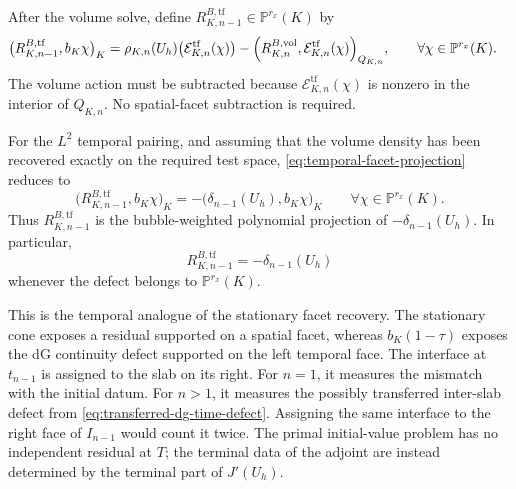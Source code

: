 After the volume solve, define \(R_{K,n-1}^{B,\mathrm{tf}}\in\mathbb P^{r_x}(K)\) by
\begin{equation}
  \begin{aligned}
  \bigl(
    R_{K,n-1}^{B,\mathrm{tf}},
    b_K\chi
  \bigr)_K
  ={}&
  \rho_{K,n}(U_h)
  \bigl(\mathcal{E}_{K,n}^{\mathrm{tf}}(\chi)\bigr) -
  \Bigl(
    R_{K,n}^{B,\mathrm{vol}},
    \mathcal{E}_{K,n}^{\mathrm{tf}}(\chi)
  \Bigr)_{Q_{K,n}},
  \qquad
  \forall\chi\in\mathbb P^{r_x}(K).
  \end{aligned}
  \label{eq:temporal-facet-projection}
\end{equation}
The volume action must be subtracted because \(\mathcal{E}_{K,n}^{\mathrm{tf}}(\chi)\) is nonzero in the interior of \(Q_{K,n}\). No spatial-facet subtraction is required.

For the \(L^2\) temporal pairing, and assuming that the volume density has been recovered exactly on the required test space, \cref{eq:temporal-facet-projection} reduces to
\begin{equation}
  \bigl(
    R_{K,n-1}^{B,\mathrm{tf}},
    b_K\chi
  \bigr)_K
  =
  -
  \bigl(
    \delta_{n-1}(U_h),
    b_K\chi
  \bigr)_K
  \qquad
  \forall\chi\in\mathbb P^{r_x}(K).
  \label{eq:temporal-density-projected-jump}
\end{equation}
Thus \(R_{K,n-1}^{B,\mathrm{tf}}\) is the bubble-weighted polynomial projection of \(-\delta_{n-1}(U_h)\). In particular,
\begin{equation}
  R_{K,n-1}^{B,\mathrm{tf}}
  =
  -\delta_{n-1}(U_h)
  \label{eq:exact-temporal-density}
\end{equation}
whenever the defect belongs to \(\mathbb P^{r_x}(K)\).

This is the temporal analogue of the stationary facet recovery. The stationary cone exposes a residual supported on a spatial facet, whereas \(b_K(1-\tau)\) exposes the dG continuity defect supported on the left temporal face. The interface at \(t_{n-1}\) is assigned to the slab on its right. For \(n=1\), it measures the mismatch with the initial datum. For \(n>1\), it measures the possibly transferred inter-slab defect from \cref{eq:transferred-dg-time-defect}. Assigning the same interface to the right face of \(I_{n-1}\) would count it twice. The primal initial-value problem has no independent residual at \(T\); the terminal data of the adjoint are instead determined by the terminal part of \(J'(U_h)\).


